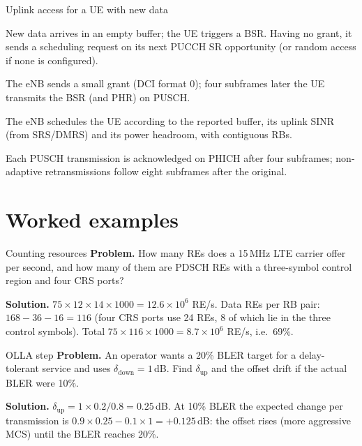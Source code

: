 \documentclass[11pt,a4paper]{article}
\begin{document}
\begin{procedurebox}{Uplink access for a UE with new data}\label{proc:ul}
\begin{steps}
  \item New data arrives in an empty buffer; the UE triggers a BSR. Having no grant, it sends a
        scheduling request on its next PUCCH SR opportunity (or random access if none is configured).
  \item The eNB sends a small grant (DCI format 0); four subframes later the UE transmits the BSR (and
        PHR) on PUSCH.
  \item The eNB schedules the UE according to the reported buffer, its uplink SINR (from SRS/DMRS) and
        its power headroom, with contiguous RBs.
  \item Each PUSCH transmission is acknowledged on PHICH after four subframes; non-adaptive
        retransmissions follow eight subframes after the original.
\end{steps}
\end{procedurebox}

\section{Worked examples}

\begin{examplebox}{Counting resources}\label{ex:count}
\textbf{Problem.} How many REs does a 15\,MHz LTE carrier offer per second, and how many of them are
PDSCH REs with a three-symbol control region and four CRS ports?

\textbf{Solution.} $75\times12\times14\times1000 = 12.6\times10^6$ RE/s. Data REs per RB pair: $168 - 36 -
16 = 116$ (four CRS ports use 24 REs, 8 of which lie in the three control symbols). Total
$75\times116\times1000 = 8.7\times10^6$ RE/s, i.e.\ 69\%.
\end{examplebox}

\begin{examplebox}{OLLA step}\label{ex:olla}
\textbf{Problem.} An operator wants a 20\% BLER target for a delay-tolerant service and uses
$\delta_{\mathrm{down}} = 1$\,dB. Find $\delta_{\mathrm{up}}$ and the offset drift if the actual BLER were
10\%.

\textbf{Solution.} $\delta_{\mathrm{up}} = 1\times0.2/0.8 = 0.25$\,dB. At 10\% BLER the expected change per
transmission is $0.9\times0.25 - 0.1\times1 = +0.125$\,dB: the offset rises (more aggressive MCS) until
the BLER reaches 20\%.
\end{examplebox}
\end{document}
